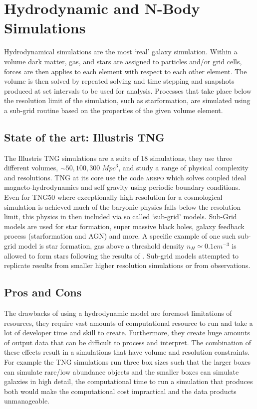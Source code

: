 \section{Hydrodynamic and N-Body Simulations}
\label{sec:Hydro}
Hydrodynamical simulations are the most `real' galaxy simulation. Within a volume dark matter, gas, and stars are assigned to particles and/or grid cells, forces are then applies to each element with respect to each other element. The volume is then solved by repeated solving and time stepping and snapshots produced at set intervals to be used for analysis. Processes that take place below the resolution limit of the simulation, such as starformation, are simulated using a sub-grid routine based on the properties of the given volume element.

\subsection{State of the art: Illustris TNG}
The Illustris TNG simulations are a suite of 18 simulations, they use three different volumes, $\sim 50, 100, 300$ ${Mpc}^{3}$, and study a range of physical complexity and resolutions. TNG at its core use the code \textsc{arepo} \citep{Springel2010EMesh} which solves coupled ideal magneto-hydrodynamics and self gravity using periodic boundary conditions. Even for TNG50 where exceptionally high resolution for a cosmological simulation is achieved much of the baryonic physics falls below the resolution limit, this physics in then included via so called `sub-grid' models. Sub-Grid models are used for star formation, super massive black holes, galaxy feedback process (starformation and AGN) and more. A specific example of one such sub-grid model is star formation, gas above a threshold density $n_H \simeq 0.1cm^{-3}$ is allowed to form stars following the results of \citet{Springel2003CosmologicalFormation}. Sub-grid models attempted to replicate results from smaller higher resolution simulations or from observations. 

\subsection{Pros and Cons}
The drawbacks of using a hydrodynamic model are foremost limitations of resources, they require vast amounts of computational resource to run and take a lot of developer time and skill to create. Furthermore, they create huge amounts of output data that can be difficult to process and interpret. The combination of these effects result in a simulations that have volume and resolution constraints. For example the TNG simulations run three box sizes such that the larger boxes can simulate rare/low abundance objects and the smaller boxes can simulate galaxies in high detail, the computational time to run a simulation that produces both would make the computational cost impractical and the data products unmanageable. 

